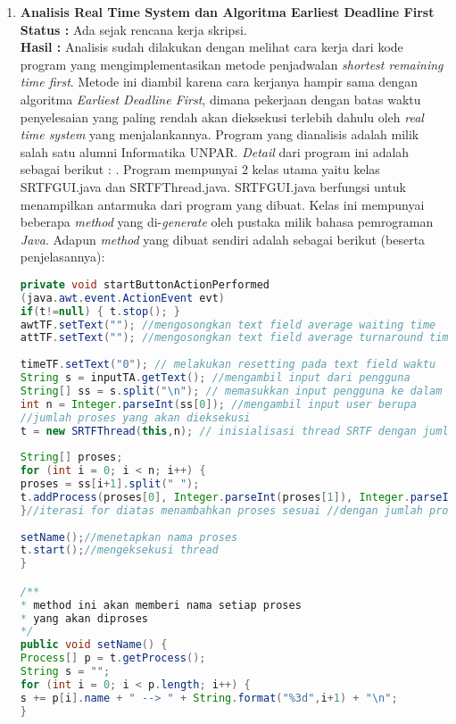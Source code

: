 \documentclass[a4paper,twoside]{article}
\begin{document}
\begin{enumerate}
		\item \textbf{Analisis Real Time System dan Algoritma Earliest Deadline First}\\
		{\bf Status :} Ada sejak rencana kerja skripsi.\\
		{\bf Hasil : }\newline
		Analisis sudah dilakukan dengan melihat cara kerja dari kode program yang mengimplementasikan metode penjadwalan {\it shortest remaining time first}. Metode ini diambil karena cara kerjanya hampir sama dengan algoritma {\it Earliest Deadline First}, dimana pekerjaan dengan batas waktu penyelesaian yang paling rendah akan dieksekusi terlebih dahulu oleh {\it real time system} yang menjalankannya. Program yang dianalisis adalah milik salah satu alumni Informatika UNPAR. {\it Detail} dari program ini adalah sebagai berikut : . Program mempunyai 2 kelas utama yaitu kelas SRTFGUI.java dan SRTFThread.java. SRTFGUI.java berfungsi untuk menampilkan antarmuka dari program yang dibuat. Kelas ini mempunyai beberapa {\it method} yang di-{\it generate} oleh pustaka milik bahasa  pemrograman {\it Java}. Adapun {\it method} yang dibuat sendiri adalah sebagai berikut (beserta penjelasannya):\newline
		\begin{lstlisting}[language=Java]
private void startButtonActionPerformed
(java.awt.event.ActionEvent evt) 
if(t!=null) { t.stop(); }
awtTF.setText(""); //mengosongkan text field average waiting time
attTF.setText(""); //mengosongkan text field average turnaround time
        
timeTF.setText("0"); // melakukan resetting pada text field waktu
String s = inputTA.getText(); //mengambil input dari pengguna
String[] ss = s.split("\n"); // memasukkan input pengguna ke dalam sebuah array
int n = Integer.parseInt(ss[0]); //mengambil input user berupa
//jumlah proses yang akan dieksekusi
t = new SRTFThread(this,n); // inisialisasi thread SRTF dengan jumlah proses N
        
String[] proses; 
for (int i = 0; i < n; i++) {
proses = ss[i+1].split(" ");
t.addProcess(proses[0], Integer.parseInt(proses[1]), Integer.parseInt(proses[2]));
}//iterasi for diatas menambahkan proses sesuai //dengan jumlah proses dari masukan pengguna
        
setName();//menetapkan nama proses
t.start();//mengeksekusi thread
}

/**
* method ini akan memberi nama setiap proses
* yang akan diproses
*/
public void setName() {
Process[] p = t.getProcess();
String s = "";
for (int i = 0; i < p.length; i++) {
s += p[i].name + " --> " + String.format("%3d",i+1) + "\n";
}
        

\end{lstlisting}
\end{enumerate}
\end{document}

